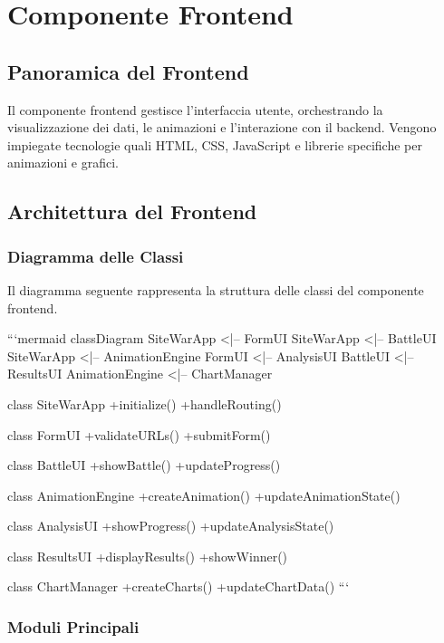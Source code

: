 
\chapter{Componente Frontend}

\section{Panoramica del Frontend}
Il componente frontend gestisce l'interfaccia utente, orchestrando la visualizzazione dei dati, le animazioni e l'interazione con il backend. Vengono impiegate tecnologie quali HTML, CSS, JavaScript e librerie specifiche per animazioni e grafici.

\section{Architettura del Frontend}

\subsection{Diagramma delle Classi}
Il diagramma seguente rappresenta la struttura delle classi del componente frontend.

```mermaid
classDiagram
    SiteWarApp <|-- FormUI
    SiteWarApp <|-- BattleUI
    SiteWarApp <|-- AnimationEngine
    FormUI <|-- AnalysisUI
    BattleUI <|-- ResultsUI
    AnimationEngine <|-- ChartManager
    
    class SiteWarApp {
        +initialize()
        +handleRouting()
    }
    
    class FormUI {
        +validateURLs()
        +submitForm()
    }
    
    class BattleUI {
        +showBattle()
        +updateProgress()
    }
    
    class AnimationEngine {
        +createAnimation()
        +updateAnimationState()
    }
    
    class AnalysisUI {
        +showProgress()
        +updateAnalysisState()
    }
    
    class ResultsUI {
        +displayResults()
        +showWinner()
    }
    
    class ChartManager {
        +createCharts()
        +updateChartData()
    }
```

\subsection{Moduli Principali}

